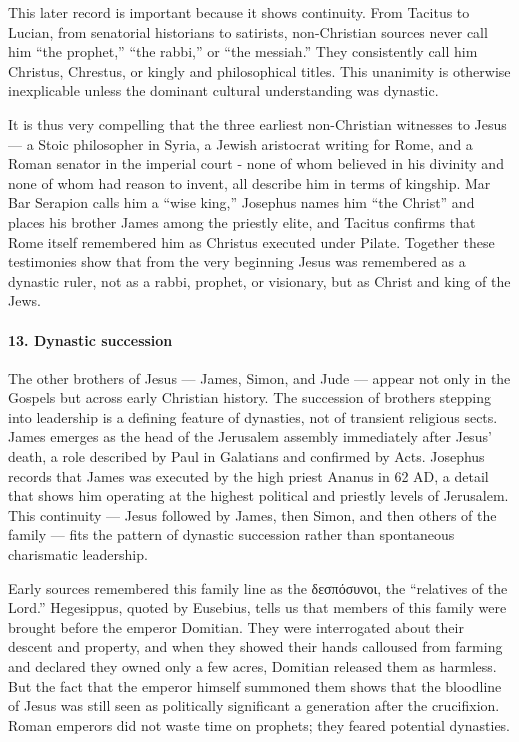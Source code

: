 This later record is important because it shows continuity.
From Tacitus to Lucian, from senatorial historians to satirists, non-Christian sources never call him “the prophet,” “the rabbi,” or “the messiah.”
They consistently call him Christus, Chrestus, or kingly and philosophical titles.
This unanimity is otherwise inexplicable unless the dominant cultural understanding was dynastic.

It is thus very compelling that the three earliest non-Christian witnesses to Jesus — a Stoic philosopher in Syria, a Jewish aristocrat writing for Rome, and a Roman senator in the imperial court - none of whom believed in his divinity and none of whom had reason to invent, all describe him in terms of kingship.
Mar Bar Serapion calls him a “wise king,” Josephus names him “the Christ” and places his brother James among the priestly elite, and Tacitus confirms that Rome itself remembered him as Christus executed under Pilate.
Together these testimonies show that from the very beginning Jesus was remembered as a dynastic ruler, not as a rabbi, prophet, or visionary, but as Christ and king of the Jews.

\paragraph{13.
Dynastic succession}\label{par:dynastic-succession}

The other brothers of Jesus — James, Simon, and Jude — appear not only in the Gospels but across early Christian history.
The succession of brothers stepping into leadership is a defining feature of dynasties, not of transient religious sects.
James emerges as the head of the Jerusalem assembly immediately after Jesus’ death, a role described by Paul in Galatians and confirmed by Acts.
Josephus records that James was executed by the high priest Ananus in 62 AD, a detail that shows him operating at the highest political and priestly levels of Jerusalem.
This continuity — Jesus followed by James, then Simon, and then others of the family — fits the pattern of dynastic succession rather than spontaneous charismatic leadership.

Early sources remembered this family line as the δεσπόσυνοι, the “relatives of the Lord.”
Hegesippus, quoted by Eusebius, tells us that members of this family were brought before the emperor Domitian.
They were interrogated about their descent and property, and when they showed their hands calloused from farming and declared they owned only a few acres, Domitian released them as harmless.
But the fact that the emperor himself summoned them shows that the bloodline of Jesus was still seen as politically significant a generation after the crucifixion.
Roman emperors did not waste time on prophets; they feared potential dynasties.

